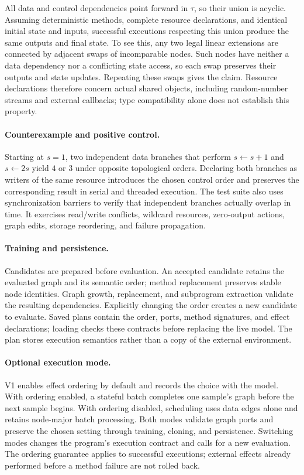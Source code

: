 All data and control dependencies point forward in $\tau$, so their union is
acyclic. Assuming deterministic methods, complete resource declarations, and
identical initial state and inputs, successful executions respecting this union
produce the same outputs and final state. To see this, any two legal linear
extensions are connected by adjacent swaps of incomparable nodes. Such nodes
have neither a data dependency nor a conflicting state access, so each swap
preserves their outputs and state updates. Repeating these swaps gives the
claim. Resource declarations therefore concern actual shared objects, including
random-number streams and external callbacks; type compatibility alone does
not establish this property.

\paragraph{Counterexample and positive control.}
Starting at $s=1$, two independent data branches that perform $s\leftarrow s+1$
and $s\leftarrow 2s$ yield $4$ or $3$ under opposite topological orders.
Declaring both branches as writers of the same resource introduces the chosen
control order and preserves the corresponding result in serial and threaded
execution. The test suite also uses synchronization barriers to verify that
independent branches actually overlap in time. It exercises read/write
conflicts, wildcard resources, zero-output actions, graph edits, storage
reordering, and failure propagation.

\paragraph{Training and persistence.}
Candidates are prepared before evaluation. An accepted candidate retains the
evaluated graph and its semantic order; method replacement preserves stable
node identities. Graph growth, replacement, and subprogram extraction validate
the resulting dependencies. Explicitly changing the order creates a new
candidate to evaluate. Saved plans contain the order, ports, method signatures,
and effect declarations; loading checks these contracts before replacing the
live model. The plan stores execution semantics rather than a copy of the
external environment.

\paragraph{Optional execution mode.}
V1 enables effect ordering by default and records the choice with the model.
With ordering enabled, a stateful batch completes one sample's graph before
the next sample begins. With ordering disabled, scheduling uses data edges
alone and retains node-major batch processing. Both modes validate graph ports
and preserve the chosen setting through training, cloning, and persistence.
Switching modes changes the program's execution contract and calls for a new
evaluation. The ordering guarantee applies to successful executions; external
effects already performed before a method failure are not rolled back.

